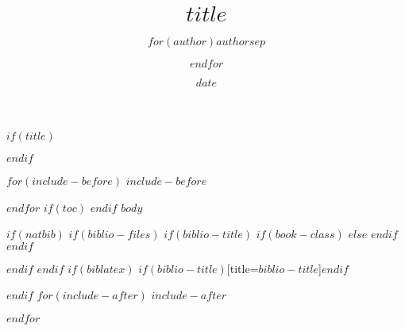 \documentclass[$if(fontsize)$$fontsize$,$endif$$if(lang)$$lang$,$endif$$if(papersize)$$papersize$,$endif$]{$documentclass$}
\title{$title$}
\author{$for(author)$$author$$sep$ \and $endfor$}
\date{$date$}
\begin{document}
$if(title)$
\maketitle
$endif$
 
$for(include-before)$
$include-before$
 
$endfor$
$if(toc)$
{
\hypersetup{linkcolor=black}
\tableofcontents
}
$endif$
$body$
 
$if(natbib)$
$if(biblio-files)$
$if(biblio-title)$
$if(book-class)$
\renewcommand\bibname{$biblio-title$}
$else$
\renewcommand\refname{$biblio-title$}
$endif$
$endif$

 
$endif$
$endif$
$if(biblatex)$
\printbibliography$if(biblio-title)$[title=$biblio-title$]$endif$
 
$endif$
$for(include-after)$
$include-after$
 
$endfor$
\end{document}
